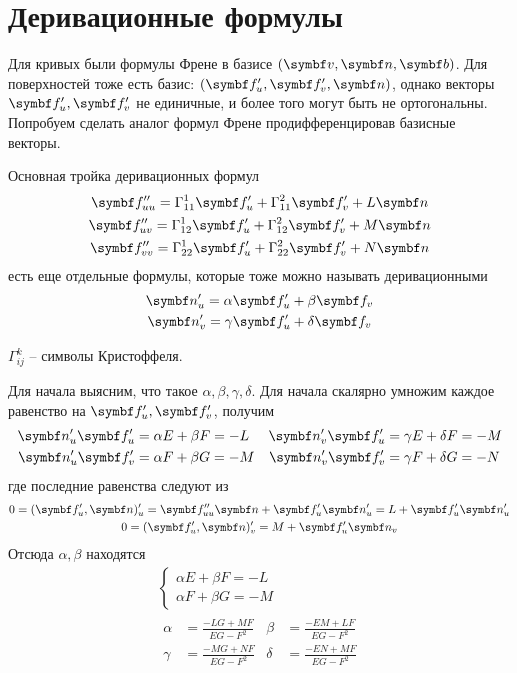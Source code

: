 \documentclass[main]{subfiles}
\begin{document}
\chapter{Деривационные формулы}
Для кривых были формулы Френе в базисе $(\vv, \vn, \vb)$.
Для поверхностей тоже есть базис: $(\vf'_u, \vf'_v, \vn)$, однако векторы $\vf'_u, \vf'_v$ не единичные,
и более того могут быть не ортогональны.
Попробуем сделать аналог формул Френе продифференцировав базисные векторы.
\begin{definition}
    Основная тройка деривационных формул
    \begin{gather*}
        \vf''_{uu} = \Gamma^1_{11} \vf'_u + \Gamma^2_{11} \vf'_v + L \vn \\
        \vf''_{uv} = \Gamma^1_{12} \vf'_u + \Gamma^2_{12} \vf'_v + M \vn \\
        \vf''_{vv} = \Gamma^1_{22} \vf'_u + \Gamma^2_{22} \vf'_v + N \vn
    \end{gather*}
    есть еще отдельные формулы, которые тоже можно называть деривационными
    \begin{gather*}
        \vn'_u = \alpha \vf'_u + \beta \vf_v\\
        \vn'_v = \gamma \vf'_u + \delta \vf_v
    \end{gather*}
\end{definition}
\begin{definition}
    $\Gamma^k_{ij}$ -- символы Кристоффеля.
\end{definition}
Для начала выясним, что такое $\alpha, \beta, \gamma, \delta$.
Для начала скалярно умножим каждое равенство на $\vf'_u, \vf'_v$, получим
\begin{align*}
    \vn'_u \vf'_u & = \alpha E + \beta F = -L & \vn'_v \vf'_u & = \gamma E + \delta F = -M \\
    \vn'_u \vf'_v & = \alpha F + \beta G = -M & \vn'_v \vf'_v & = \gamma F + \delta G = -N
\end{align*}
где последние равенства следуют из
\begin{gather*}
    0 = (\vf'_u, \vn)'_u = \vf''_{uu} \vn + \vf'_u \vn'_u = L + \vf'_u \vn'_u\\
    0 = (\vf'_u, \vn)'_v = M + \vf'_u \vn_v
\end{gather*}
Отсюда $\alpha, \beta$ находятся
\begin{gather*}
    \begin{cases}
        \alpha E + \beta F = -L \\
        \alpha F + \beta G = -M
    \end{cases}\\
    \begin{aligned}
        \alpha & = \frac{-LG + MF}{EG - F^2} & \beta  & = \frac{-EM + LF}{EG - F^2} \\
        \gamma & = \frac{-MG + NF}{EG - F^2} & \delta & = \frac{-EN + MF}{EG - F^2}
    \end{aligned}
\end{gather*}
\end{document}

